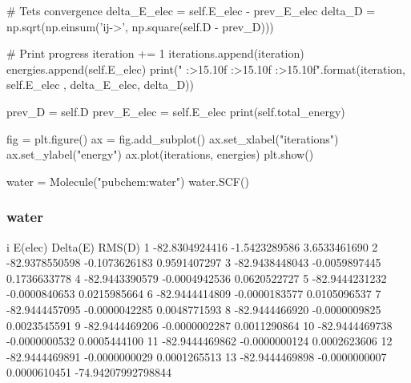 \documentclass{beamer}
\begin{document}
    \begin{frame}[fragile]
        \begin{python}
             # Tets convergence
            delta_E_elec = self.E_elec - prev_E_elec
            delta_D = np.sqrt(np.einsum('ij->', np.square(self.D - prev_D)))
        \end{python}
    \end{frame}
    \begin{frame}[fragile]
        \begin{python}
            # Print progress
            iteration += 1
            iterations.append(iteration)
            energies.append(self.E_elec)
            print("{} {:>15.10f} {:>15.10f} {:>15.10f}".format(iteration, self.E_elec , delta_E_elec, delta_D))

        
            prev_D = self.D
            prev_E_elec = self.E_elec
        print(self.total_energy)
    \end{python}
\end{frame}
\begin{frame}[fragile]
    \begin{python}        
        fig = plt.figure()
        ax = fig.add_subplot()
        ax.set_xlabel("iterations")
        ax.set_ylabel("energy")
        ax.plot(iterations, energies)
        plt.show()

    \end{python}
    \begin{python}        
water = Molecule("pubchem:water")
water.SCF()
    \end{python}
\end{frame}
\begin{frame}[fragile]
    \frametitle{water}
    \begin{python}[basicstyle=\scriptsize]
        i         E(elec)        Delta(E)          RMS(D)
        1  -82.8304924416   -1.5423289586    3.6533461690
        2  -82.9378550598   -0.1073626183    0.9591407297
        3  -82.9438448043   -0.0059897445    0.1736633778
        4  -82.9443390579   -0.0004942536    0.0620522727
        5  -82.9444231232   -0.0000840653    0.0215985664
        6  -82.9444414809   -0.0000183577    0.0105096537
        7  -82.9444457095   -0.0000042285    0.0048771593
        8  -82.9444466920   -0.0000009825    0.0023545591
        9  -82.9444469206   -0.0000002287    0.0011290864
        10  -82.9444469738   -0.0000000532    0.0005444100
        11  -82.9444469862   -0.0000000124    0.0002623606
        12  -82.9444469891   -0.0000000029    0.0001265513
        13  -82.9444469898   -0.0000000007    0.0000610451
        -74.94207992798844

    \end{python}
\end{frame}
\end{document}
